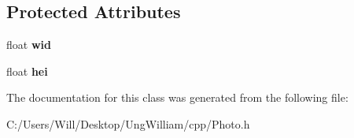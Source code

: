 \subsection*{Protected Attributes}
\begin{DoxyCompactItemize}
\item 
float {\bfseries wid}\hypertarget{class_photo_a4f4048eed34821248f4c3be53cedd544}{}\label{class_photo_a4f4048eed34821248f4c3be53cedd544}

\item 
float {\bfseries hei}\hypertarget{class_photo_a999ec71ceb2c57ed25053c2cbcdc225e}{}\label{class_photo_a999ec71ceb2c57ed25053c2cbcdc225e}

\end{DoxyCompactItemize}


The documentation for this class was generated from the following file\+:\begin{DoxyCompactItemize}
\item 
C\+:/\+Users/\+Will/\+Desktop/\+Ung\+William/cpp/Photo.\+h\end{DoxyCompactItemize}
